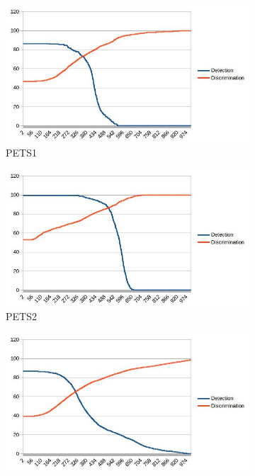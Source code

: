 \begin{figure}
  \begin{subfigure}{.49\linewidth}
  \includegraphics[width=1\linewidth]{figures/pets1_coneR1_response.jpg}
  \caption{PETS1}
\end{subfigure}
\hfill
\begin{subfigure}{.49\linewidth}
  \includegraphics[width=1\linewidth]{figures/pets2_coneR1_response.jpg}
  \caption{PETS2}
\end{subfigure}
\hfill
\begin{subfigure}{.49\linewidth}
  \includegraphics[width=1\linewidth]{figures/highway1_coneR1_response.jpg}

\end{subfigure}
\end{figure}
